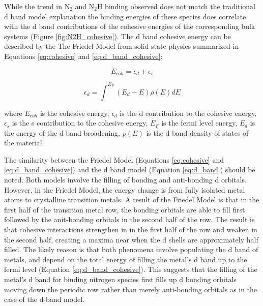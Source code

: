 \documentclass[catalysts,article,submit,moreauthors,pdftex,10pt,a4paper]{mdpi}
\theoremstyle{mdpi}
\newcounter{ex}
\newcounter{re}
\theoremstyle{mdpidefinition}
\begin{document}
While the trend in N$_2$ and N$_2$H binding observed does not match the traditional d band model explanation the binding energies of these species does correlate with the d band contributions of the cohesive energies of the corresponding bulk systems (Figure \ref{fig:N2H_cohesive}). The d band cohesive energy can be described by the The Friedel Model \cite{1969TPom} from solid state physics summarized in Equations \ref{eq:cohesive} and \ref{eq:d_band_cohesive}:


\begin{equation}
    E_{coh} = \epsilon_d + \epsilon_s
    \label{eq:cohesive}
\end{equation}

\begin{equation}
    \epsilon_d = \int^{E_F} (E_d-E)\rho(E)dE
    \label{eq:d_band_cohesive}
\end{equation}

where $E_{coh}$ is the cohesive energy, $\epsilon_d$ is the d contribution to the cohesive energy, $\epsilon_s$ is the s contribution to the cohesive energy, $E_F$ is the fermi level energy, $E_d$ is the energy of the d band broadening, $\rho(E)$ is the d band density of states of the material. 

The similarity between the Friedel Model (Equations \ref{eq:cohesive} and \ref{eq:d_band_cohesive}) and the d band model (Equation \ref{eq:d_band}) should be noted. Both models involve the filling of bonding and anti-bonding d orbitals. However, in the Friedel Model, the energy change is from fully isolated metal atoms to crystalline transition metals. A result of the Friedel Model is that in the first half of the transition metal row, the bonding orbitals are able to fill first followed by the anit-bonding orbitals in the second half of the row. The result is that cohesive interactions strengthen in in the first half of the row and weaken in the second half, creating a maxima near when the d shells are approximately half filled. The likely reason is that both phenomena involve populating the d band of metals, and depend on the total energy of filling the metal's d band up to the fermi level (Equation \ref{eq:d_band_cohesive}). This suggests that the filling of the metal's d band for binding nitrogen species first fills up d bonding orbitals moving down the periodic row rather than merely anti-bonding orbitals as in the case of the d-band model.

\end{document}
